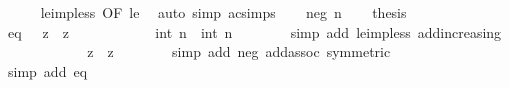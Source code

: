 \begin{isabellebody}
\ \ \ \ \isamarkupfalse%
\ le{\isacharunderscore}{\kern0pt}imp{\isacharunderscore}{\kern0pt}{}{\isacharunderscore}{\kern0pt}less\ {\isacharbrackleft}{\kern0pt}OF\ le{\isacharbrackright}{\kern0pt}\ \isamarkupfalse%
\ {\isacharparenleft}{\kern0pt}auto\ simp{\isacharcolon}{\kern0pt}\ ac{\isacharunderscore}{\kern0pt}simps{\isacharparenright}{\kern0pt}\isanewline
{}\isamarkupfalse%
\isanewline
\ \ \isamarkupfalse%
\ {\isacharparenleft}{\kern0pt}neg\ n{\isacharparenright}{\kern0pt}\isanewline
\ \ \isamarkupfalse%
\ {\isacharquery}{\kern0pt}thesis\isanewline
\ \ \isamarkupfalse%
\isanewline
\ \ \ \ \isamarkupfalse%
\ eq{\isacharcolon}{\kern0pt}\ {\isachardoublequoteopen}{}\ {\isacharplus}{\kern0pt}\ z\ {\isacharplus}{\kern0pt}\ z\ {\isacharequal}{\kern0pt}\ {}{\isachardoublequoteclose}\isanewline
\ \ \ \ \isamarkupfalse%
\ {\isachardoublequoteopen}{}\ {\isacharless}{\kern0pt}\ {}\ {\isacharplus}{\kern0pt}\ {\isacharparenleft}{\kern0pt}int\ n\ {\isacharplus}{\kern0pt}\ int\ n{\isacharparenright}{\kern0pt}{\isachardoublequoteclose}\isanewline
\ \ \ \ \ \ \isamarkupfalse%
\ {\isacharparenleft}{\kern0pt}simp\ add{\isacharcolon}{\kern0pt}\ le{\isacharunderscore}{\kern0pt}imp{\isacharunderscore}{\kern0pt}{}{\isacharunderscore}{\kern0pt}less\ add{\isacharunderscore}{\kern0pt}increasing{\isacharparenright}{\kern0pt}\isanewline
\ \ \ \ \isamarkupfalse%
\ \isamarkupfalse%
\ {\isachardoublequoteopen}{\isasymdots}\ {\isacharequal}{\kern0pt}\ {\isacharminus}{\kern0pt}\ {\isacharparenleft}{\kern0pt}{}\ {\isacharplus}{\kern0pt}\ z\ {\isacharplus}{\kern0pt}\ z{\isacharparenright}{\kern0pt}{\isachardoublequoteclose}\isanewline
\ \ \ \ \ \ \isamarkupfalse%
\ {\isacharparenleft}{\kern0pt}simp\ add{\isacharcolon}{\kern0pt}\ neg\ add{\isachardot}{\kern0pt}assoc\ {\isacharbrackleft}{\kern0pt}symmetric{\isacharbrackright}{\kern0pt}{\isacharparenright}{\kern0pt}\isanewline
\ \ \ \ \isamarkupfalse%
\ \isamarkupfalse%
\ {\isachardoublequoteopen}{\isasymdots}\ {\isacharequal}{\kern0pt}\ {}{\isachardoublequoteclose}\ \isamarkupfalse%
\ {\isacharparenleft}{\kern0pt}simp\ add{\isacharcolon}{\kern0pt}\ eq{\isacharparenright}{\kern0pt}\isanewline
\ \ \ \ \isamarkupfalse%
\ \isamarkupfalse%
\ {\isachardoublequoteopen}{}{\isacharless}{\kern0pt}{}{\isachardoublequoteclose}\ \isacommand{{\isachardot}{\kern0pt}{\isachardot}{\kern0pt}}\isamarkupfalse%

\end{isabellebody}
